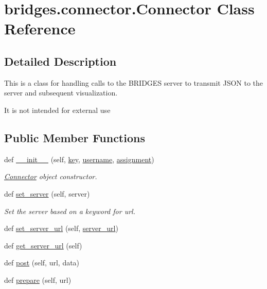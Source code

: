 \hypertarget{classbridges_1_1connector_1_1_connector}{}\section{bridges.\+connector.\+Connector Class Reference}
\label{classbridges_1_1connector_1_1_connector}


\subsection{Detailed Description}
This is a class for handling calls to the B\+R\+I\+D\+G\+ES server to transmit J\+S\+ON to the server and subsequent visualization. 

It is not intended for external use \subsection*{Public Member Functions}
\begin{DoxyCompactItemize}
\item 
def \hyperlink{classbridges_1_1connector_1_1_connector_a2d5af7535b60c92433f2333951b7ea69}{\+\_\+\+\_\+init\+\_\+\+\_\+} (self, \hyperlink{classbridges_1_1connector_1_1_connector_a3b577c34402fea1910f56fd9cac51c07}{key}, \hyperlink{classbridges_1_1connector_1_1_connector_af2f4f996092cf63a5e7940ca93a2c6b7}{username}, \hyperlink{classbridges_1_1connector_1_1_connector_a2df020c062b6224d4eeb2c5407c02656}{assignment})
\begin{DoxyCompactList}\small\item\em \hyperlink{classbridges_1_1connector_1_1_connector}{Connector} object constructor. \end{DoxyCompactList}\item 
def \hyperlink{classbridges_1_1connector_1_1_connector_aabe66803d7701015138288c5ceeba81f}{set\+\_\+server} (self, server)
\begin{DoxyCompactList}\small\item\em Set the server based on a keyword for url. \end{DoxyCompactList}\item 
def \hyperlink{classbridges_1_1connector_1_1_connector_a6cfa754618584132754cea9a8bde5282}{set\+\_\+server\+\_\+url} (self, \hyperlink{classbridges_1_1connector_1_1_connector_abcc06e345e43916cf975eb200187d911}{server\+\_\+url})
\item 
def \hyperlink{classbridges_1_1connector_1_1_connector_a1db4c60fd9c2817c2ff237bdfb98e4a9}{get\+\_\+server\+\_\+url} (self)
\item 
def \hyperlink{classbridges_1_1connector_1_1_connector_abfc36138302d5ec49219cb3ccf48439a}{post} (self, url, data)
\item 
def \hyperlink{classbridges_1_1connector_1_1_connector_afcd39dd1f2f37a945e16254e0fed178b}{prepare} (self, url)
\end{DoxyCompactItemize}
